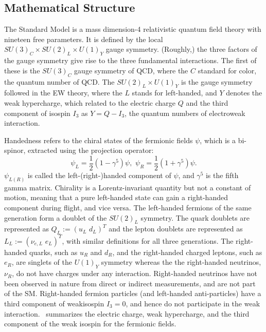 \subsection{Mathematical Structure}
The Standard Model is a mass dimension-4 relativistic quantum field theory with nineteen free parameters. It is defined by the local $SU(3)_C \times SU(2)_L \times U(1)_Y$ gauge symmetry. (Roughly,) the three factors of the gauge symmetry give rise to the three fundamental interactions. The first of these is the $SU(3)_C$ gauge symmetry of QCD, where the $C$ standard for color, the quantum number of QCD. The $SU(2)_L \times U(1)_Y$ is the gauge symmetry followed in the EW theory, where the $L$ stands for left-handed, and $Y$ denotes the weak hypercharge, which related to the electric charge $Q$ and the third component of isospin $I_3$ as $Y=Q-I_3$, the quantum numbers of electroweak interaction. 

Handedness refers to the chiral states of the fermionic fields $\psi$, which is a bi-spinor, extracted using the projection operator:
\begin{equation}
    \psi_L=\frac{1}{2}(1-\gamma^5)\psi,\,\, \psi_R=\frac{1}{2}(1+\gamma^5)\psi.
\end{equation}
$\psi_{L(R)}$ is called the left-(right-)handed component of $\psi$, and $\gamma^5$ is the fifth gamma matrix. Chirality is a Lorentz-invariant quantity but not a constant of motion, meaning that a pure left-handed state can gain a right-handed component during flight, and vice versa. The left-handed fermions of the same generation form a doublet of the $SU(2)_L$ symmetry. The quark doublets are represented as $Q_L:= (u_L\,\, d_L)^T$ and the lepton doublets are represented as $L_L := (\nu_{e,L}\,\, e_L)^T$, with similar definitions for all three generations. The right-handed quarks, such as $u_R$ and $d_R$, and the right-handed charged leptons, such as $e_R$, are singlets of the $U(1)_Y$ symmetry whereas the the right-handed neutrinos, $\nu_R$, do not have charges under any interaction. Right-handed neutrinos have not been observed in nature from direct or indirect measurements, and are not part of the SM. Right-handed fermion particles (and left-handed anti-particles) have a third component of weakisospin $I_3=0$, and hence do not participate in the weak interaction.~ summarizes the electric charge, weak hypercharge, and the third component of the weak isospin for the fermionic fields.

